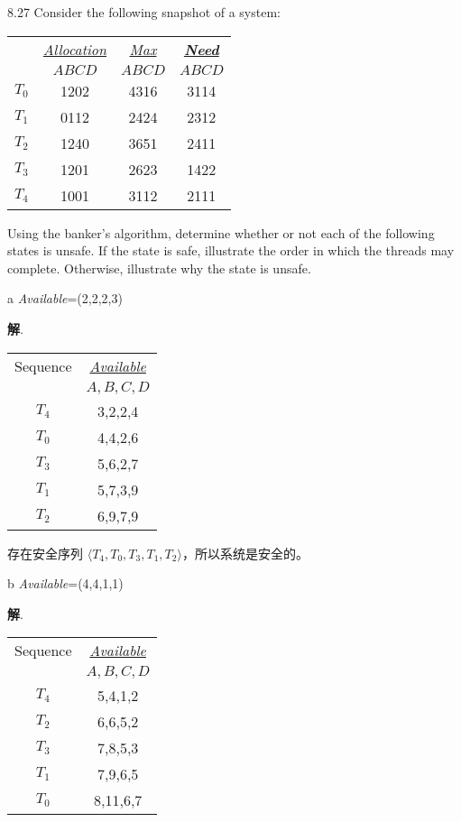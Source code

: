 \documentclass[12pt,a4paper]{article}
\newenvironment{problems}{\begin{list}{}{\renewcommand{\makelabel}[1]{\textbf{##1}\hfil}}}{\end{list}}
\newenvironment{steps}{\begin{list}{}{\renewcommand{\makelabel}[1]{##1.\hfil}}}{\end{list}}
\providecommand{\sol}{\textbf{解}.~}
\begin{document}
\begin{problems}
    \item[8.27] Consider the following snapshot of a system:
     
    \begin{tabular}{cccc}
        & \underline{\emph{Allocation}} & \underline{\emph{Max}} & \underline{\textbf{\emph{Need}}}\\
        & $ABCD$ & $ABCD$ & $ABCD$ \\
   $T_0$ & 1202 & 4316 & 3114\\
   $T_1$ & 0112 & 2424 & 2312\\
   $T_2$ & 1240 & 3651 & 2411\\
   $T_3$ & 1201 & 2623 & 1422\\
   $T_4$ & 1001 & 3112 & 2111
   \end{tabular} 

   Using the banker's algorithm, determine whether or not each of the following states is unsafe. If the state is safe, illustrate the order in which the threads may complete. Otherwise, illustrate why the state is unsafe.
   \begin{steps}
    \item[a] \emph{Available}=(2,2,2,3)
     
    \sol \begin{tabular}{cc}
        Sequence  & \underline{\emph{Available}} \\
          & $A,B,C,D$ \\
      $T_4$ & 3,2,2,4 \\
      $T_0$ & 4,4,2,6 \\
      $T_3$ & 5,6,2,7 \\
      $T_1$ & 5,7,3,9 \\
      $T_2$ & 6,9,7,9
      \end{tabular} 

      存在安全序列 $\langle T_4,T_0,T_3,T_1,T_2 \rangle$，所以系统是安全的。
    \item[b] \emph{Available}=(4,4,1,1)
    
    \sol \begin{tabular}{cc}
        Sequence  & \underline{\emph{Available}} \\
          & $A,B,C,D$ \\
      $T_4$ & 5,4,1,2 \\
      $T_2$ & 6,6,5,2 \\
      $T_3$ & 7,8,5,3 \\
      $T_1$ & 7,9,6,5 \\
      $T_0$ & 8,11,6,7
      \end{tabular} 


\end{steps}
\end{problems}
\end{document}
